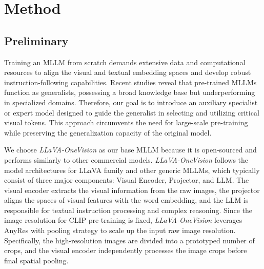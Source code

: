 \section{Method}

\subsection{Preliminary}
Training an MLLM from scratch demands extensive data and computational resources to align the visual and textual embedding spaces and develop robust instruction-following capabilities. Recent studies \cite{xie2024emovit, face, pose} reveal that pre-trained MLLMs function as generalists, possessing a broad knowledge base but underperforming in specialized domains. Therefore, our goal is to introduce an auxiliary specialist or expert model designed to guide the generalist in selecting and utilizing critical visual tokens. This approach circumvents the need for large-scale pre-training while preserving the generalization capacity of the original model.

We choose \textit{LLaVA-OneVision} \cite{llavaonevision} as our base MLLM because it is open-sourced and performs similarly to other commercial models. \textit{LLaVA-OneVision} follows the model architectures for LLaVA family \cite{llava,llava15,llava_interleave,llavanext} and other generic MLLMs, which typically consist of three major components: Visual Encoder, Projector, and LLM. The visual encoder \cite{clip, siglip} extracts the visual information from the raw images, the projector aligns the spaces of visual features with the word embedding, and the LLM is responsible for textual instruction processing and complex reasoning. Since the image resolution for CLIP pre-training is fixed, \textit{LLaVA-OneVision} leverages AnyRes with pooling strategy to scale up the input raw image resolution. Specifically, the high-resolution images are divided into a prototyped number of crops, and the visual encoder independently processes the image crops before final spatial pooling. 


